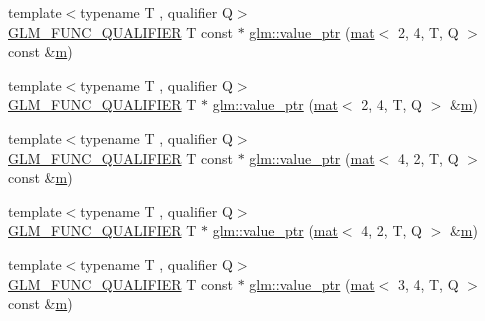 \begin{DoxyCompactItemize}
{\footnotesize template$<$typename T , qualifier Q$>$ }\\\mbox{\hyperlink{setup_8hpp_a33fdea6f91c5f834105f7415e2a64407}{G\+L\+M\+\_\+\+F\+U\+N\+C\+\_\+\+Q\+U\+A\+L\+I\+F\+I\+ER}} T const  $\ast$ \mbox{\hyperlink{group__gtc__type__ptr_ga81f821818736c8cb80a899cf5819aac9}{glm\+::value\+\_\+ptr}} (\mbox{\hyperlink{structglm_1_1mat}{mat}}$<$ 2, 4, T, Q $>$ const \&\mbox{\hyperlink{_s_d_l__opengl__glext_8h_af593500c283bf1a787a6f947f503a5c2}{m}})
\item 
{\footnotesize template$<$typename T , qualifier Q$>$ }\\\mbox{\hyperlink{setup_8hpp_a33fdea6f91c5f834105f7415e2a64407}{G\+L\+M\+\_\+\+F\+U\+N\+C\+\_\+\+Q\+U\+A\+L\+I\+F\+I\+ER}} T $\ast$ \mbox{\hyperlink{group__gtc__type__ptr_ga4c03b3900c5a82d8915b0c8c6d5dce4e}{glm\+::value\+\_\+ptr}} (\mbox{\hyperlink{structglm_1_1mat}{mat}}$<$ 2, 4, T, Q $>$ \&\mbox{\hyperlink{_s_d_l__opengl__glext_8h_af593500c283bf1a787a6f947f503a5c2}{m}})
\item 
{\footnotesize template$<$typename T , qualifier Q$>$ }\\\mbox{\hyperlink{setup_8hpp_a33fdea6f91c5f834105f7415e2a64407}{G\+L\+M\+\_\+\+F\+U\+N\+C\+\_\+\+Q\+U\+A\+L\+I\+F\+I\+ER}} T const  $\ast$ \mbox{\hyperlink{group__gtc__type__ptr_gaf8be997c8fa6dea9773f195e35f2df05}{glm\+::value\+\_\+ptr}} (\mbox{\hyperlink{structglm_1_1mat}{mat}}$<$ 4, 2, T, Q $>$ const \&\mbox{\hyperlink{_s_d_l__opengl__glext_8h_af593500c283bf1a787a6f947f503a5c2}{m}})
\item 
{\footnotesize template$<$typename T , qualifier Q$>$ }\\\mbox{\hyperlink{setup_8hpp_a33fdea6f91c5f834105f7415e2a64407}{G\+L\+M\+\_\+\+F\+U\+N\+C\+\_\+\+Q\+U\+A\+L\+I\+F\+I\+ER}} T $\ast$ \mbox{\hyperlink{group__gtc__type__ptr_gabf9cfd331a42dd9feb54a5cbc858509a}{glm\+::value\+\_\+ptr}} (\mbox{\hyperlink{structglm_1_1mat}{mat}}$<$ 4, 2, T, Q $>$ \&\mbox{\hyperlink{_s_d_l__opengl__glext_8h_af593500c283bf1a787a6f947f503a5c2}{m}})
\item 
{\footnotesize template$<$typename T , qualifier Q$>$ }\\\mbox{\hyperlink{setup_8hpp_a33fdea6f91c5f834105f7415e2a64407}{G\+L\+M\+\_\+\+F\+U\+N\+C\+\_\+\+Q\+U\+A\+L\+I\+F\+I\+ER}} T const  $\ast$ \mbox{\hyperlink{group__gtc__type__ptr_gaf93bd83ae6520e9cdafdcd3f483dfeb3}{glm\+::value\+\_\+ptr}} (\mbox{\hyperlink{structglm_1_1mat}{mat}}$<$ 3, 4, T, Q $>$ const \&\mbox{\hyperlink{_s_d_l__opengl__glext_8h_af593500c283bf1a787a6f947f503a5c2}{m}})
\item 

\end{DoxyCompactItemize}
